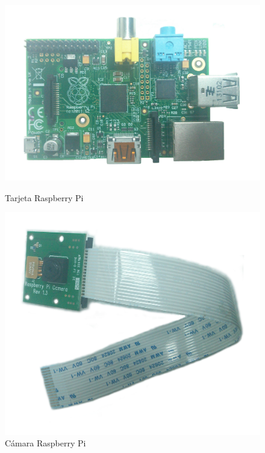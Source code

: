 \begin{figure}[hbtp]
\centering
\includegraphics[scale=0.06]{imagenes/RaspberryPi.jpg}
\caption{Tarjeta Raspberry Pi}
\label{fig:Raspe}
\centering
\includegraphics[scale=0.06]{imagenes/CamRasp.jpg}
\caption{C\'amara Raspberry Pi}
\label{fig:came}
\end{figure}

